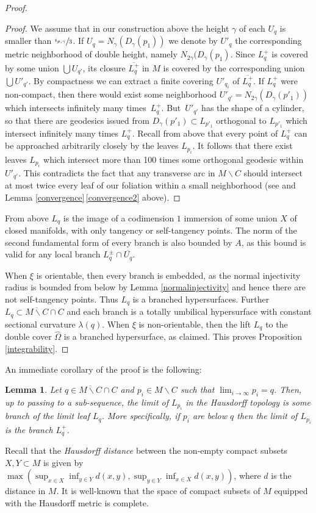 \documentclass[JEP,XML,SOM,Unicode]{cedram}
\let\moins\smallsetminus
\newtheorem{lemma}[theorem]{Lemma}
\theoremstyle{definition}
\theoremstyle{remark}
\numberwithin{equation}{section}
\begin{document}
\begin{proof}
\begin{proof}
We assume that in our construction above the height $\gamma$ of each $U_q$
is smaller than $\sfrac{i_{p,\gamma}}{3}$. If $U_q=N_{\gamma}(D_{\gamma}(p_1))$ we denote by $U'_q$ the corresponding metric neighborhood of
double height, namely $N_{2\gamma}(D_{\gamma}(p_1)$.
Since $L^+_q$ is covered by some union $\bigcup U_{q'}$, its closure $\overline{L^+_q}$ in $M$ is
covered by the corresponding union $\bigcup U'_{q'}$. By compactness we can extract a finite covering $U'_{q_i}$ of $\overline{L^+_q}$.
If $L^+_q$ were non-compact, then there would exist some neighborhood
$U'_{q'}=N_{2\gamma}(D_{\gamma}(p'_1))$ which intersects infinitely many times~$L^+_q$.
But~$U'_{q'}$ has the shape of a cylinder, so that there are geodesics issued from $D_{\gamma}(p'_1)\subset L_{p'_1}$ orthogonal to $L_{p'_1}$
which intersect infinitely many times $L^+_q$.
Recall from above that every point of $L^+_q$ can be approached
arbitrarily closely by the leaves $L_{p_i}$. It follows that there exist leaves $L_{p_i}$ which intersect more than 100 times some
orthogonal geodesic within $U'_{q'}$.
This contradicts the fact that any transverse arc in $M\moins C$ should intersect at most twice every leaf of our foliation within a small neighborhood
(see \cite[Lem.\,2, p.\,385]{Hae} and Lemma \ref{convergence}\,\eqref{convergence2} above).
\end{proof}

From above $L_q$ is the image of a codimension $1$ immersion of some union $X$ of closed manifolds,
with only tangency or self-tangency points. The norm of the second fundamental form of every branch is also bounded by $A$,
as this bound is valid for any local branch $L_q^{\pm}\cap \overline{U_q}$.

When $\xi$ is orientable, then every branch is embedded, as the
normal injectivity radius is bounded from below by Lemma \ref{normalinjectivity} and hence there are not
self-tangency points. Thus $L_q$ is a branched hypersurfaces.
Further $L_q\subset \overline{M\moins C}\cap C$ and each branch is a totally umbilical hypersurface with constant sectional
curvature $\lambda(q)$.
When $\xi$ is non-orientable, then the lift $L_q$ to the double cover $\widehat{\Omega}$ is a branched hypersurface, as claimed.
This proves Proposition \ref{integrability}.
\end{proof}

An immediate corollary of the proof is the following:
\begin{lemma}\label{Hausdorff}
Let $q\in \overline{M\moins C}\cap C$ and $p_i\in M\moins C$ such that $\lim_{i\to \infty}p_i=q$. Then, up to passing to a sub-sequence,
the limit of $L_{p_i}$ in the Hausdorff topology is some branch of the limit leaf $L_q$. More specifically, if
$p_i$ are below $q$ then the limit of $L_{p_i}$ is the branch $L_q^+$.
\end{lemma}
Recall that the \emph{Hausdorff distance} between the
non-empty compact subsets \hbox{$X,Y\subset M$} is
given by $\max(\sup_{x\in X} \inf_{y\in Y} d(x,y), \sup_{y\in Y}\inf_{x\in X} d(x,y))$, where
$d$ is the distance in $M$. It is well-known that the space of compact subsets of $M$ equipped with the Hausdorff metric
is complete.
\end{document}
